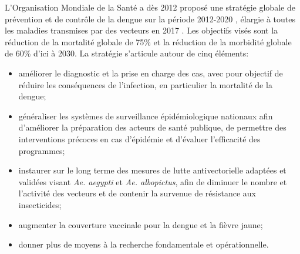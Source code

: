L'Organisation Mondiale de la Santé a dès 2012 proposé une stratégie globale de prévention et de contrôle de la dengue sur la période 2012-2020 \cite{who2012global}, élargie à toutes les maladies transmises par des vecteurs en 2017 \cite{who2017global}.
Les objectifs visés sont la réduction de la mortalité globale de 75\% et la réduction de la morbidité globale de 60\% d'ici à 2030.
La stratégie s'articule autour de cinq éléments:
\begin{itemize}
\item améliorer le diagnostic et la prise en charge des cas, avec pour objectif de réduire les conséquences de l'infection, en particulier la mortalité de la dengue;
\item généraliser les systèmes de surveillance épidémiologique nationaux afin d'améliorer la préparation des acteurs de santé publique, de permettre des interventions précoces en cas d'épidémie et d'évaluer l'efficacité des programmes;
\item instaurer sur le long terme des mesures de lutte antivectorielle adaptées et validées visant {\em Ae. aegypti} et {\em Ae. albopictus}, afin de diminuer le nombre et l'activité des vecteurs et de contenir la survenue de résistance aux insecticides;
\item augmenter la couverture vaccinale pour la dengue et la fièvre jaune;
\item donner plus de moyens à la recherche fondamentale et opérationnelle.
\end{itemize}



